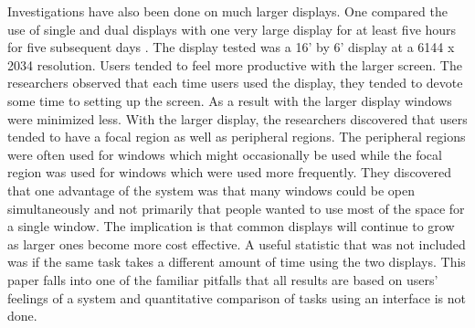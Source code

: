   Investigations have also been done on much larger displays.  One compared the use of single and dual displays with one very large display for at least five hours for five subsequent days \cite{1518855}. The display tested was a 16' by 6' display at a 6144 x 2034 resolution. Users tended to feel more productive with the larger screen. The researchers observed that each time users used the display, they tended to devote some time to setting up the screen. As a result with the larger display windows were minimized less. With the larger display, the researchers discovered that users tended to have a focal region as well as peripheral regions. The peripheral regions were often used for windows which might occasionally be used while the focal region was used for windows which were used more frequently. They discovered that one advantage of the system was that many windows could be open simultaneously and not primarily that people wanted to use most of the space for a single window. The implication is that common displays will continue to grow as larger ones become more cost effective. A useful statistic that was not included was if the same task takes a different amount of time using the two displays.    This paper falls into one of the familiar pitfalls that all results are based on users' feelings of a system and quantitative comparison of tasks using an interface is not done.

\begin{comment}
  This paper discusses the problem that a lot of research done (apparently at adobe) never actually gets read. Her solution is to present the findings in a more interesting manner, namely, a comic book. It's not so much a user study as a summary of a trial and some comments made, but it is interesting that it seems that some people will be more drawn into something if it just displayed in a more interesting medium. \cite{1358653}\\
\end{comment}

